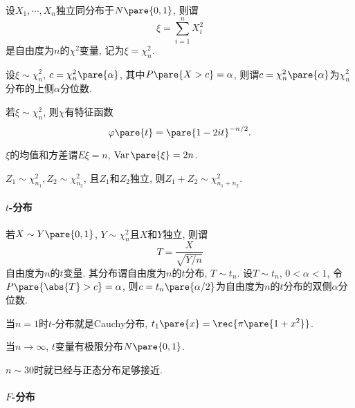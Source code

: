 \documentclass{ctexart}
\DeclareMathOperator{\Var}{Var}
\begin{document}
设$X_1,\cdots,X_n$独立同分布于$N\pare{0,1}$, 则谓
\[ \xi = \sum_{i=1}^n X_i^2 \]
是自由度为$n$的$\chi^2$变量, 记为$\xi = \chi_n^2$.
\par
设$\xi \sim \chi_n^2$, $c = \chi_n^2\pare{\alpha}$, 其中$P\pare{X>c}=\alpha$, 则谓$c=\chi_n^2\pare{\alpha}$为$\chi_n^2$分布的上侧$\alpha$分位数.

\begin{corollary}
    \begin{cenum}
        \item 若$\xi\sim\chi_n^2$, 则$\chi$有特征函数
        \[ \varphi\pare{t} = \pare{1-2it}^{-n/2}. \]
        \item $\xi$的均值和方差谓$E\xi = n$, $\Var\pare{\xi} = 2n$.
        \item $Z_1\sim \chi_{n_1}^2, Z_2 \sim \chi_{n_2}^2$, 且$Z_1$和$Z_2$独立, 则$Z_1+Z_2 \sim \chi_{n_1+n_2}^2$.
    \end{cenum}
\end{corollary}


\paragraph{$t$-分布} %
\label{par:t分布}

若$X\sim Y\pare{0,1}$, $Y\sim \chi_n^2$且$X$和$Y$独立, 则谓
\[ T = \frac{X}{\sqrt{Y/n}} \]
自由度为$n$的$t$变量. 其分布谓自由度为$n$的$t$分布, $T \sim t_n$. 设$T\sim t_n$, $0<\alpha<1$, 令$P\pare{\abs{T}>c} = \alpha$, 则$c = t_n\pare{\alpha/2}$为自由度为$n$的$t$分布的双侧$\alpha$分位数.

\begin{corollary}[$t$-分布的性质]
    \begin{cenum}
        \item 当$n=1$时$t$-分布就是Cauchy分布, $\displaystyle t_1\pare{x} = \rec{\pi \pare{1+x^2}}$.
        \item 当$n\rightarrow \infty$, $t$变量有极限分布$N\pare{0,1}$.
    \end{cenum}
\end{corollary}
\begin{remark}
    $n\sim 30$时就已经与正态分布足够接近.
\end{remark}


\paragraph{$F$-分布} %
\label{par:F分布}
\end{document}
